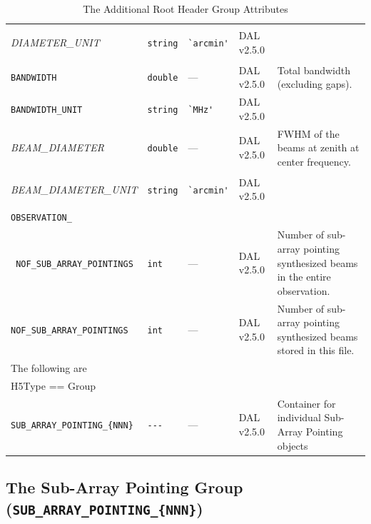 \documentclass[a4paper,10pt,bibtotoc]{scrartcl}
\begin{document}
\begin{small}
\begin{table}[p]
\begin{small}
\begin{tabular}{|llllp{6cm}|}
  \begin{scriptsize}\textit{ DIAMETER\_UNIT}\end{scriptsize}  & \verb|string| & \verb|`arcmin'| & DAL v2.5.0 & \\
  \verb|BANDWIDTH|  & \verb|double| & --- & DAL v2.5.0 & Total bandwidth (excluding gaps). \\
  \verb|BANDWIDTH_UNIT|  & \verb|string| & \verb|`MHz'| & DAL v2.5.0 & \\
  \begin{scriptsize}\textit{BEAM\_DIAMETER}\end{scriptsize}  & \verb|double| & --- & DAL v2.5.0 & FWHM of the beams at zenith at center frequency. \\
  \begin{scriptsize}\textit{BEAM\_DIAMETER\_UNIT}\end{scriptsize}  & \verb|string| & \verb|`arcmin'| & DAL v2.5.0 & \\
  \verb|OBSERVATION_|  &  &  &  &  \\
  \verb| NOF_SUB_ARRAY_POINTINGS|  & \verb|int| & --- & DAL v2.5.0 & Number of sub-array pointing synthesized beams in the entire observation. \\
  \verb|NOF_SUB_ARRAY_POINTINGS|  & \verb|int| & --- & DAL v2.5.0 & Number of sub-array pointing synthesized beams stored in this file. \\
  \hline
  \sc The following are & \sc & \sc & \sc   &\\
  \sc H5Type == Group & \sc & \sc & \sc   &\\
  \hline 
  \verb|SUB_ARRAY_POINTING_{NNN}|  & \verb|---| & --- & DAL v2.5.0 &  Container for individual Sub-Array Pointing objects \\
  \hline
  \end{tabular}
  \caption{The Additional Root Header Group Attributes}
  \label{tab:root attributes}
\end{small}
\end{table}
\end{small}

\clearpage


\subsection{The Sub-Array Pointing Group ({\tt SUB\_ARRAY\_POINTING\_\{NNN\}})}
\label{sec:sub-array pointing group}
\end{document}
